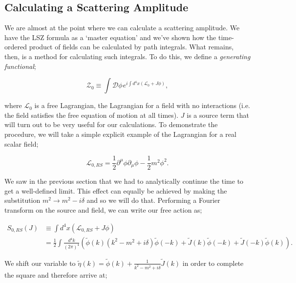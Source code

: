 \subsection{Calculating a Scattering Amplitude}

We are almost at the point where we can calculate a scattering amplitude. We have the LSZ formula as a `master equation' and we've shown how the time-ordered product of fields can be calculated by path integrals. What remains, then, is a method for calculating such integrals. To do this, we define a \emph{generating functional};

\begin{equation}
\mathcal{Z}_0 \equiv \int \mathcal{D} \phi \hspace{1pt} e^{i \int d^4x (\mathscr{L}_0 + J \phi)},
\end{equation}

where $\mathscr{L}_0$ is a free Lagrangian, the Lagrangian for a field with no interactions (i.e. the field satisfies the free equation of motion at all times). $J$ is a source term that will turn out to be very useful for our calculations. To demonstrate the procedure, we will take a simple explicit example of the Lagrangian for a real scalar field;

\begin{equation}
\mathscr{L}_{0,RS} = \frac{1}{2}\partial^\mu \phi \partial_\mu \phi - \frac{1}{2} m^2 \phi^2.
\end{equation} 

We saw in the previous section that we had to analytically continue the time to get a well-defined limit. This effect can equally be achieved by making the substitution $m^2 \to m^2 - i \delta$ and so we will do that. Performing a Fourier transform on the source and field, we can write our free action as;

\begin{equation}
\begin{split}
S_{0,RS}(J) & \equiv \int d^4 x (\mathscr{L}_{0,RS} + J \phi) \\
&= \frac{1}{2} \int \frac{d^4k}{(2 \pi)^4} \left(\tilde{\phi}(k)(k^2 - m^2 + i \delta) \tilde{\phi}(-k) + \tilde{J}(k) \tilde{\phi}(-k) + \tilde{J}(-k)\tilde{\phi}(k) \right).
\end{split}
\end{equation}

We shift our variable to $\tilde{\eta}(k) = \tilde{\phi}(k) + \frac{1}{k^2 - m^2 + i \delta}\tilde{J}(k)$ in order to complete the square and therefore arrive at;

